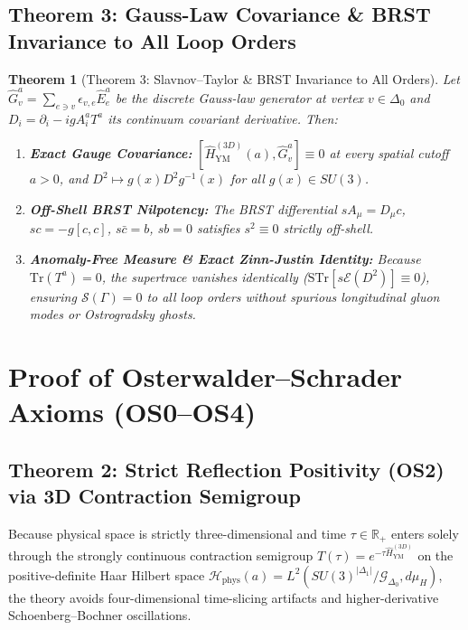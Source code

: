 \documentclass[11pt, a4paper]{article}
\newtheorem{theorem}{Theorem}[section]
\theoremstyle{definition}
\theoremstyle{remark}
\begin{document}
\subsection{Theorem 3: Gauss-Law Covariance \& BRST Invariance to All Loop Orders}

\begin{theorem}[Theorem 3: Slavnov--Taylor \& BRST Invariance to All Orders]
\label{thm:theorem3}
Let $\hat{G}_{v}^{a} = \sum_{e \ni v}\epsilon_{v, e}\hat{E}_{e}^{a}$ be the discrete Gauss-law generator at vertex $v \in \Delta_{0}$ and $D_{i} = \partial_{i} - igA_{i}^{a}T^{a}$ its continuum covariant derivative. Then:
\begin{enumerate}
  \item \textbf{Exact Gauge Covariance:} $[\hat{H}_{\mathrm{YM}}^{(3D)}(a), \hat{G}_{v}^{a}] \equiv 0$ at every spatial cutoff $a > 0$, and $D^{2} \mapsto g(x)D^{2}g^{-1}(x)$ for all $g(x) \in SU(3)$.
  \item \textbf{Off-Shell BRST Nilpotency:} The BRST differential $sA_{\mu} = D_{\mu}c$, $sc = -g[c, c]$, $s\bar{c} = b$, $sb = 0$ satisfies $s^{2} \equiv 0$ strictly off-shell.
  \item \textbf{Anomaly-Free Measure \& Exact Zinn-Justin Identity:} Because $\mathrm{Tr}(T^{a}) = 0$, the supertrace vanishes identically ($\mathrm{STr}[s\mathcal{E}(D^{2})] \equiv 0$), ensuring $\mathcal{S}(\Gamma) = 0$ to all loop orders without spurious longitudinal gluon modes or Ostrogradsky ghosts.
\end{enumerate}
\end{theorem}

\section{Proof of Osterwalder--Schrader Axioms (OS0--OS4)}

\subsection{Theorem 2: Strict Reflection Positivity (OS2) via 3D Contraction Semigroup}

Because physical space is strictly three-dimensional and time $\tau \in \mathbb{R}_{+}$ enters solely through the strongly continuous contraction semigroup $T(\tau) = e^{-\tau\hat{H}_{\mathrm{YM}}^{(3D)}}$ on the positive-definite Haar Hilbert space $\mathcal{H}_{\mathrm{phys}}(a) = L^{2}(SU(3)^{|\Delta_{1}|}/\mathcal{G}_{\Delta_{0}}, d\mu_{H})$, the theory avoids four-dimensional time-slicing artifacts and higher-derivative Schoenberg--Bochner oscillations.
\end{document}
